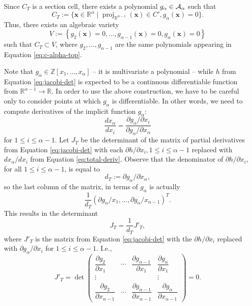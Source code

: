 \documentclass[
]{book}
\theoremstyle{definition}
\theoremstyle{definition}
\theoremstyle{definition}
\theoremstyle{definition}
\theoremstyle{remark}
\begin{document}
Since \(C_T\) is a section cell, there exists a polynomial \(g_\alpha \in {\cal A}_\alpha\) such that \[
C_T := \{ \mathbf{x} \in \mathbb{R}^\alpha \mid {\operatorname{proj}_{\mathbb{R}^{\alpha - 1}}}(\mathbf{x}) \in C', g_\alpha(\mathbf{x}) = 0 \}.
\] Thus, there exists an algebraic variety
\begin{equation}
V := \left\{ g_2(\mathbf{x}) = 0, \ldots, g_{\alpha-1}(\mathbf{x}) = 0, g_\alpha(\mathbf{x}) = 0 \right\}
\label{eq:variety-v}
\end{equation}
such that \(C_T \subset V\), where \(g_2,\ldots,g_{\alpha - 1}\) are the same polynomials appearing in Equation \eqref{eq:c-alpha-top}.

Note that \(g_\alpha \in \mathbb{Z}[x_1,\ldots,x_\alpha]\) -- it is multivariate a polynomial -- while \(h\) from Equation \eqref{eq:jacobi-det} is expected to be a continuous differentiable function from \(\mathbb{R}^{\alpha - 1} \to \mathbb{R}\). In order to use the above construction, we have to be careful only to consider points at which \(g_\alpha\) is differentiable.
In other words, we need to compute derivatives of the implicit function \(g_\alpha\):
\begin{equation}
\dfrac{d x_\alpha}{d x_i} = \dfrac{\partial g_\alpha / \partial x_i}{\partial g_\alpha / \partial x_\alpha}
\label{eq:total-deriv}
\end{equation}
for \(1\le i \le \alpha - 1\).
Let \(J_T\) be the determinant of the matrix of partial derivatives from Equation \eqref{eq:jacobi-det} with each \(\partial h / \partial x_i, 1 \le i \le \alpha - 1\) replaced with \(d x_\alpha / d x_i\) from Equation \eqref{eq:total-deriv}. Observe that the denominator of \(\partial h / \partial x_i\), for all \(1 \le i \le \alpha - 1\), is equal to
\[d_T := \partial g_\alpha / \partial x_\alpha,\]
so the last column of the matrix, in terms of \(g_\alpha\) is actually
\[
\dfrac{1}{d_T} \left( \partial g_{\alpha} / x_1 , \ldots , \partial g_{\alpha} / x_{\alpha - 1}\right)^T.
\]
This results in the determinant
\[
J_T = \frac{1}{d_T} J'_T,
\]
where \(J'_T\) is the matrix from Equation \eqref{eq:jacobi-det} with the \(\partial h / \partial x_i\) replaced with \(\partial g_\alpha / \partial x_i\) for \(1\le i \le \alpha - 1\). I.e.,
\begin{equation}
J'_T = \det\begin{pmatrix}\dfrac{\partial g_{2}}{\partial x_{1}} & \cdots & \dfrac{\partial g_{\alpha-1}}{\partial x_{1}} & \dfrac{\partial g_\alpha}{\partial x_{1}}\\
\vdots &  &  & \vdots\\
\dfrac{\partial g_{2}}{\partial x_{\alpha-1}} & \cdots & \dfrac{\partial g_{\alpha-1}}{\partial x_{\alpha-1}} & \dfrac{\partial g_\alpha}{\partial x_{\alpha-1}}
\end{pmatrix}=0.
\label{eq:jacobi-det-2}
\end{equation}
\end{document}
